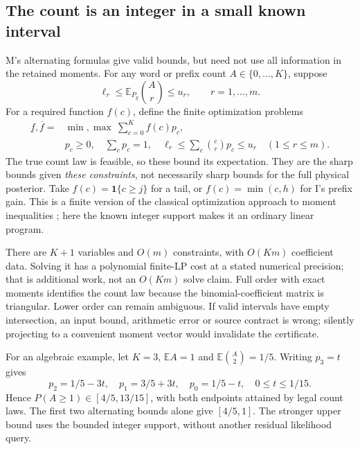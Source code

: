 \documentclass[10pt,a4paper]{article}
\newcommand{\E}{\mathbb E}
\newcommand{\ind}{\mathbf 1}
\begin{document}
\subsection{The count is an integer in a small known interval}
M's alternating formulas give valid bounds, but need not use all information in the retained moments.
For any word or prefix count $A\in\{0,\ldots,K\}$, suppose
\[
 \ell_r\leq\E_{P_y}\binom Ar\leq u_r,\qquad r=1,\ldots,m.
\]
For a required function $f(c)$, define the finite optimization problems
\begin{equation}
 \begin{split}
 \underline f,\overline f={}&\min,\max\ \sum_{c=0}^K f(c)p_c,\\
 &p_c\geq0,\quad \sum_cp_c=1,\quad
 \ell_r\leq\sum_c\binom crp_c\leq u_r\quad(1\leq r\leq m).
 \end{split}
 \label{eq:count-moment-lp}
\end{equation}
The true count law is feasible, so these bound its expectation. They are the sharp bounds given
\emph{these constraints}, not necessarily sharp bounds for the full physical posterior.
Take $f(c)=\ind\{c\geq j\}$ for a tail, or $f(c)=\min(c,h)$ for I's prefix gain.
This is a finite version of the classical optimization approach to moment inequalities
\cite{bertsimas-popescu}; here the known integer support makes it an ordinary linear program.

There are $K+1$ variables and $O(m)$ constraints, with $O(Km)$ coefficient data.
Solving it has a polynomial finite-LP cost at a stated numerical precision; that is additional work,
not an $O(Km)$ solve claim. Full order with exact moments identifies the count law because the
binomial-coefficient matrix is triangular. Lower order can remain ambiguous.
If valid intervals have empty intersection, an input bound, arithmetic error or source contract is wrong;
silently projecting to a convenient moment vector would invalidate the certificate.

For an algebraic example, let $K=3$, $\E A=1$ and $\E\binom A2=1/5$.
Writing $p_3=t$ gives
\[
 p_2=1/5-3t,\quad p_1=3/5+3t,\quad p_0=1/5-t,\quad 0\leq t\leq1/15.
\]
Hence $P(A\geq1)\in[4/5,13/15]$, with both endpoints attained by legal count laws.
The first two alternating bounds alone give $[4/5,1]$.
The stronger upper bound uses the bounded integer support, without another residual likelihood query.
\end{document}
